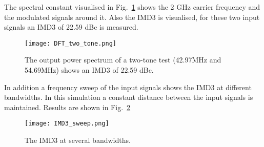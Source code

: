 The spectral constant visualised in Fig.~\ref{fig:DFT_two_tone} shows the 2 GHz carrier frequency and the modulated signals around it. Also the IMD3 is visualised, for these two input signals an IMD3 of 22.59 dBc is measured.
\begin{figure}[h] 
\texttt{[image: DFT\_two\_tone.png]}
\caption{The output power spectrum of a two-tone test (42.97MHz and 54.69MHz) shows an IMD3 of 22.59 dBc.}
\label{fig:DFT_two_tone}
\end{figure}
In addition a frequency sweep of the input signals shows the IMD3 at different bandwidths. In this simulation a constant distance between the input signals is maintained. Results are shown in Fig.~\ref{fig:IMD3}
\begin{figure}[h] 
\texttt{[image: IMD3\_sweep.png]}
\caption{The IMD3 at several bandwidths.}
\label{fig:IMD3}
\end{figure}

